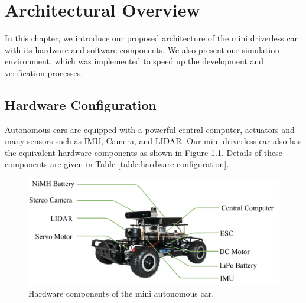 \chapter{Architectural Overview}
\label{chp:b3}

In this chapter, we introduce our proposed architecture of the mini driverless
car with its hardware and software components. We also present our simulation
environment, which was implemented to speed up the development and
verification processes.

\section{Hardware Configuration}

Autonomous cars are equipped with a powerful central computer, actuators and
many sensors such as IMU, Camera, and LIDAR. Our mini driverless car also has
the equivalent hardware components as shown in Figure
\ref{figure:hardware-configuration}. Details of these components are given in
Table \ref{table:hardware-configuration}.

\begin{figure}[h]
  \centering
  \includegraphics[width=.8\textwidth]{figures/hardware-configuration.pdf}
  \caption[Hardware components of the mini autonomous car]{Hardware components
    of the mini autonomous car.}
  \label{figure:hardware-configuration}
\end{figure}

